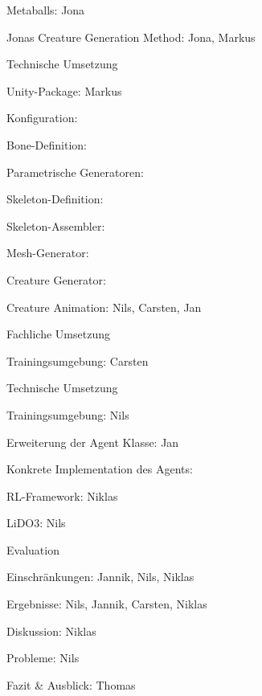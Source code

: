 \begin{thallok}
\begin{thallok}
\begin{thallok}
\begin{thallok}
					\item Metaballs: Jona
					\item Jonas Creature Generation Method: Jona, Markus
				\end{thallok}
			\item Technische Umsetzung
				\begin{thallok}
					\item Unity-Package: Markus
					\item Konfiguration:
					\item Bone-Definition: 
					\item Parametrische Generatoren: 
					\item Skeleton-Definition: 
					\item Skeleton-Assembler:
					\item Mesh-Generator:
					\item Creature Generator:
				\end{thallok}
		\end{thallok}
		\item Creature Animation: Nils, Carsten, Jan
		\begin{thallok}
			\item Fachliche Umsetzung
				\begin{thallok}
					\item Trainingsumgebung: Carsten
				\end{thallok}
			\item Technische Umsetzung
				\begin{thallok}
					\item Trainingsumgebung: Nils
					\item Erweiterung der Agent Klasse: Jan
					\item Konkrete Implementation des Agents:
					\item RL-Framework: Niklas
					\item LiDO3: Nils
				\end{thallok}
		\end{thallok}
	\end{thallok}
	\item Evaluation
	\begin{thallok}
		\item Einschränkungen: Jannik, Nils, Niklas
		\item Ergebnisse: Nils, Jannik, Carsten, Niklas
		\item Diskussion: Niklas
		\item Probleme: Nils
	\end{thallok}
	\item Fazit \& Ausblick: Thomas
\end{thallok}

